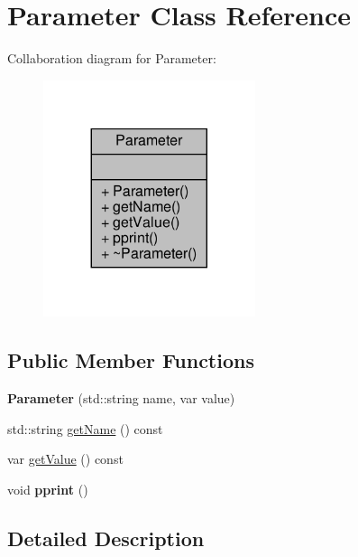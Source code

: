 \hypertarget{classParameter}{}\section{Parameter Class Reference}
\label{classParameter}


Collaboration diagram for Parameter\+:\nopagebreak
\begin{figure}[H]
\begin{center}
\leavevmode
\includegraphics[width=176pt]{classParameter__coll__graph}
\end{center}
\end{figure}
\subsection*{Public Member Functions}
\begin{DoxyCompactItemize}
\item 
\mbox{\label{classParameter_ad97fb10933adaa11fe8d4a3222ec72c2}} 
{\bfseries Parameter} (std\+::string name, var value)
\item 
std\+::string \hyperlink{classParameter_a6687b858b004ed892c764f86b9a1c965}{get\+Name} () const
\item 
var \hyperlink{classParameter_acb6003c8455f06d2191af29524142b16}{get\+Value} () const
\item 
\mbox{\label{classParameter_a49b4f1c57d65b634d7f5fd14bddd587f}} 
void {\bfseries pprint} ()
\end{DoxyCompactItemize}


\subsection{Detailed Description}


